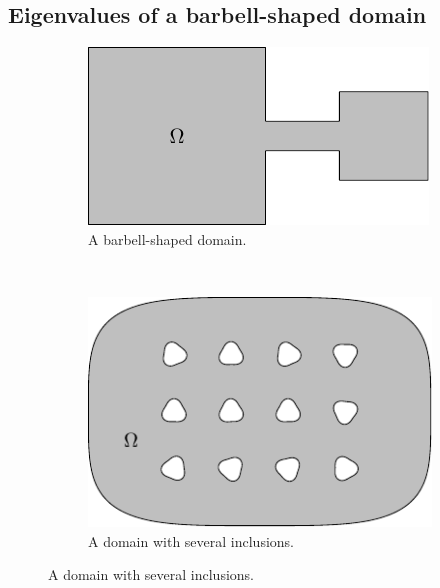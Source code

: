 \subsection{Eigenvalues of a barbell-shaped domain}
\label{subsec:barbell}

\begin{figure}
  \centering
  \begin{subfigure}[t]{0.4\textwidth}
    \centering
    \includegraphics[width=\textwidth]{fig/ex_barbell_001_bdry}
    \caption{A barbell-shaped domain.}
    \label{subfig:barbell_bdry}
  \end{subfigure}
  ~
  \begin{subfigure}[t]{0.4\textwidth}
    \centering
    \includegraphics[width=\textwidth]{fig/ex_many_holes_004_bdry}
    \caption{A domain with several inclusions.}
    \label{subfig:many_inclusions_bdry}
  \end{subfigure}
\end{figure}

